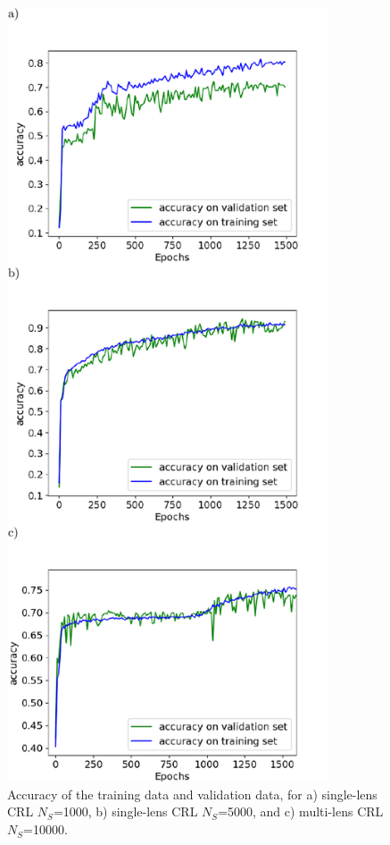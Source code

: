 \documentclass{iucr}
\begin{document}
\begin{figure}\label{fig:v12v13}
    \includegraphics[width=0.85\textwidth]{figures/figure3.pdf}
    \caption{Accuracy of the training data and validation data, for a) single-lens CRL $N_S$=1000, b) single-lens CRL $N_S$=5000, and c) multi-lens CRL $N_S$=10000.
    }
\end{figure}
\end{document}
